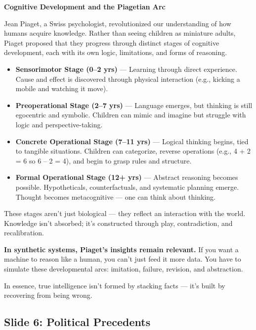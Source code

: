 \begin{PsychologicalSidebar}{\textbf{Cognitive Development and the Piagetian Arc}}

    Jean Piaget, a Swiss psychologist, revolutionized our understanding of how humans acquire knowledge. Rather than seeing children as miniature adults, Piaget proposed that they progress through distinct stages of cognitive development, each with its own logic, limitations, and forms of reasoning.
    
    \begin{itemize}
    \item \textbf{Sensorimotor Stage (0–2 yrs)} — Learning through direct experience. Cause and effect is discovered through physical interaction (e.g., kicking a mobile and watching it move).
    \item \textbf{Preoperational Stage (2–7 yrs)} — Language emerges, but thinking is still egocentric and symbolic. Children can mimic and imagine but struggle with logic and perspective-taking.
    \item \textbf{Concrete Operational Stage (7–11 yrs)} — Logical thinking begins, tied to tangible situations. Children can categorize, reverse operations (e.g., 4 + 2 = 6 so 6 – 2 = 4), and begin to grasp rules and structure.
    \item \textbf{Formal Operational Stage (12+ yrs)} — Abstract reasoning becomes possible. Hypotheticals, counterfactuals, and systematic planning emerge. Thought becomes metacognitive — one can think about thinking.
    \end{itemize}
    
    These stages aren’t just biological — they reflect an interaction with the world. Knowledge isn’t absorbed; it’s constructed through play, contradiction, and recalibration.
    
    \textbf{In synthetic systems, Piaget’s insights remain relevant.} If you want a machine to reason like a human, you can’t just feed it more data. You have to simulate these developmental arcs: imitation, failure, revision, and abstraction.
    
    In essence, true intelligence isn’t formed by stacking facts — it’s built by recovering from being wrong.
    
\end{PsychologicalSidebar}

\subsection{Slide 6: Political Precedents}

